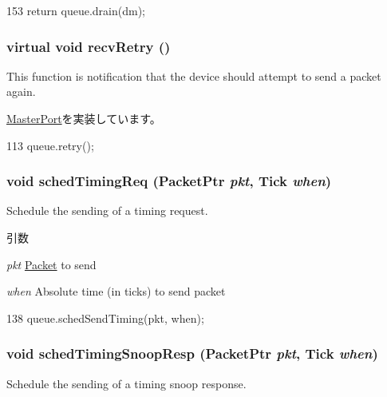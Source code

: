 \begin{DoxyCode}
153 { return queue.drain(dm); }
\end{DoxyCode}
\hypertarget{classQueuedMasterPort_a7ec461ad187b82b4b21e27c86e45cf9c}{
\subsubsection[{recvRetry}]{\setlength{\rightskip}{0pt plus 5cm}virtual void recvRetry ()}}
\label{classQueuedMasterPort_a7ec461ad187b82b4b21e27c86e45cf9c}
This function is notification that the device should attempt to send a packet again. 

\hyperlink{classMasterPort_ac1ccc3bcf7ebabb20b57fab99b2be5b0}{MasterPort}を実装しています。


\begin{DoxyCode}
113 { queue.retry(); }
\end{DoxyCode}
\hypertarget{classQueuedMasterPort_a6e835b0c02fcb4679fc14de7605b4f13}{
\subsubsection[{schedTimingReq}]{\setlength{\rightskip}{0pt plus 5cm}void schedTimingReq ({\bf PacketPtr} {\em pkt}, \/  {\bf Tick} {\em when})}}
\label{classQueuedMasterPort_a6e835b0c02fcb4679fc14de7605b4f13}
Schedule the sending of a timing request.


\begin{DoxyParams}{引数}
\item[{\em pkt}]\hyperlink{classPacket}{Packet} to send \item[{\em when}]Absolute time (in ticks) to send packet \end{DoxyParams}



\begin{DoxyCode}
138     { queue.schedSendTiming(pkt, when); }
\end{DoxyCode}
\hypertarget{classQueuedMasterPort_aedc38469f895c00a0ffcb993598b7a53}{
\subsubsection[{schedTimingSnoopResp}]{\setlength{\rightskip}{0pt plus 5cm}void schedTimingSnoopResp ({\bf PacketPtr} {\em pkt}, \/  {\bf Tick} {\em when})}}
\label{classQueuedMasterPort_aedc38469f895c00a0ffcb993598b7a53}
Schedule the sending of a timing snoop response.


